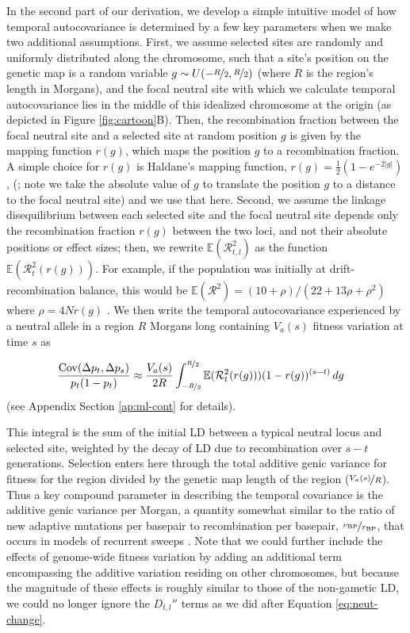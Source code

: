 \documentclass[11pt]{article}
\newcommand{\E}{\mathbb{E}}
\DeclareMathOperator{\cov}{Cov}
\begin{document}
In the second part of our derivation, we develop a simple intuitive model of
how temporal autocovariance is determined by a few key parameters when we make
two additional assumptions. First, we assume selected sites are randomly and
uniformly distributed along the chromosome, such that a site's position on the
genetic map is a random variable $g \sim U(-\nicefrac{R}{2}, \nicefrac{R}{2})$
(where $R$ is the region's length in Morgans), and the focal neutral site with
which we calculate temporal autocovariance lies in the middle of this idealized
chromosome at the origin (as depicted in Figure \ref{fig:cartoon}B). Then,
the recombination fraction between the focal neutral site and a selected site
at random position $g$ is given by the mapping function $r(g)$, which maps
the position $g$ to a recombination fraction. A simple choice for $r(g)$ is
Haldane's mapping function, $r(g) = \frac{1}{2} (1 - e^{-2|g|})$,
(\cite{Haldane1919-qp}; note we take the absolute value of $g$ to translate
the position $g$ to a distance to the focal neutral site) and we use that
here. Second, we assume the linkage disequilibrium between each selected site
and the focal neutral site depends only the recombination fraction $r(g)$
between the two loci, and not their absolute positions or effect sizes; then,
we rewrite $\E(\mathcal{R}^2_{t,l})$ as the function
$\E(\mathcal{R}^2_t(r(g)))$. For example, if the population was initially at
drift-recombination balance, this would be $\E(\mathcal{R}^2) = (10 + \rho)/(22
+ 13 \rho + \rho^2)$ where $\rho = 4Nr(g)$ \parencite{Ohta1969-ae,Hill1968-ue}.
We then write the temporal autocovariance experienced by a neutral allele in a region
$R$ Morgans long containing $V_a(s)$ fitness variation at time $s$ as

\begin{align}
  \frac{\cov(\Delta p_t, \Delta p_s)}{p_t(1-p_t) } &\approx \frac{V_a(s)}{2 R} \int_{-\nicefrac{R}{2}}^{\nicefrac{R}{2}} \E(\mathcal{R}_t^2(r(g))) (1-r(g))^{(s-t)} \,dg
  \label{eq:ave-neut-autocov}
\end{align}
%
(see Appendix Section \ref{ap:ml-cont} for details).

This integral is the sum of the initial LD between a typical neutral locus and
selected site, weighted by the decay of LD due to recombination over $s-t$
generations. Selection enters here through the total additive genic variance
for fitness for the region divided by the genetic map length of the region
($\nicefrac{V_a(s)}{R}$). Thus a key compound parameter in describing the
temporal covariance is the additive genic variance per Morgan, a quantity
somewhat similar to the ratio of new adaptive mutations per basepair to
recombination per basepair, $\nicefrac{\nu_\text{BP}}{r_\text{BP}}$, that
occurs in models of recurrent sweeps \parencite{Stephan1992-jc}. Note that we
could further include the effects of genome-wide fitness variation by adding an
additional term encompassing the additive variation residing on other
chromosomes, but because the magnitude of these effects is roughly similar to
those of the non-gametic LD, we could no longer ignore the $D_{t,l}''$ terms as
we did after Equation \eqref{eq:neut-change}.
\end{document}
